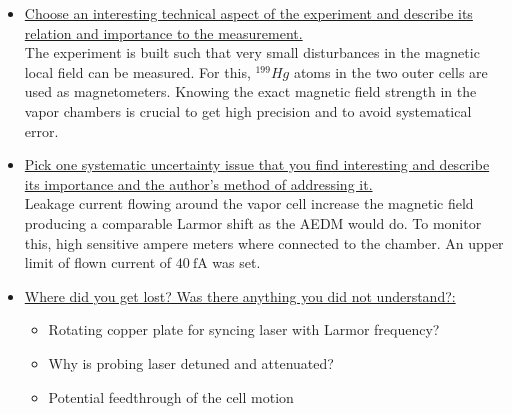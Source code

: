\documentclass[12pt]{article}
\begin{document}
\begin{itemize}
	\item \ul{Choose an interesting technical aspect of the experiment and describe its relation and importance to the measurement.} \\
	\noindent
	The experiment is built such that very small disturbances in the magnetic local field can be measured. For this, $^{199}Hg$ atoms in the two outer cells are used as magnetometers. Knowing the exact magnetic field strength in the vapor chambers is crucial to get high precision and to avoid systematical error.  
	
	\item \ul{Pick one systematic uncertainty issue that you find interesting and describe its importance and the author's method of addressing it.}\\
	\noindent
	Leakage current flowing around the vapor cell increase the magnetic field producing a comparable Larmor shift as the AEDM would do. To monitor this, high sensitive ampere meters where connected to the chamber. An upper limit of flown current of $\SI{40}{\femto\ampere}$ was set. 
	
	\item \ul{Where did you get lost? Was there anything you did not understand?:} \\
	\noindent
	\begin{itemize}
		\item Rotating copper plate for syncing laser with Larmor frequency?
		\item Why is probing laser detuned and attenuated?
		\item Potential feedthrough of the cell motion
	\end{itemize}
	
	
	
\end{itemize}
\end{document}
